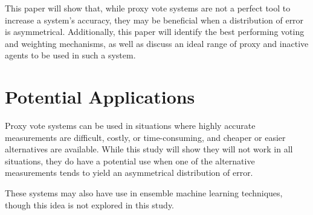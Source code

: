 This paper will show that, while proxy vote systems are not a perfect tool to
increase a system's accuracy, they may be beneficial when a distribution of error is
asymmetrical.
Additionally, this paper will identify the best performing voting and weighting
mechanisms, as well as discuss an ideal range of proxy and inactive agents to be used
in such a system.


\section{Potential Applications}\label{sec:potential-applications}
Proxy vote systems can be used in situations where highly accurate measurements are
difficult, costly, or time-consuming, and cheaper or easier alternatives are available.
While this study will show they will not work in all situations, they do have a
potential use when one of the alternative measurements tends to yield an asymmetrical
distribution of error.

These systems may also have use in ensemble machine learning techniques, though this
idea is not explored in this study.
